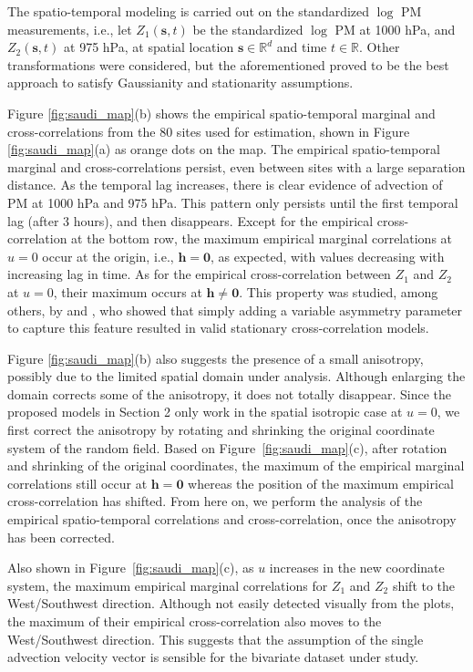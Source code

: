 \documentclass[12pt]{article}
\newcommand{\0}{\mathbf{0}}
\begin{document}
The spatio-temporal modeling is carried out on the standardized $\log $ PM measurements, i.e., let $Z_1(\mathbf{s},t)$ be the standardized $\log $ PM at 1000 hPa, and $Z_2(\mathbf{s},t)$ at 975 hPa, at spatial location $\mathbf{s} \in \mathbb{R}^d$ and time $t\in\mathbb{R}$. Other transformations were considered, but the aforementioned proved to be the best approach to satisfy Gaussianity and stationarity assumptions. 

Figure \ref{fig:saudi_map}(b) shows the empirical spatio-temporal marginal and cross-correlations from the 80 sites used for estimation, shown in Figure \ref{fig:saudi_map}(a) as orange dots on the map. The empirical spatio-temporal marginal and cross-correlations persist, even between sites with a large separation distance. As the temporal lag increases, there is clear evidence of advection of PM at 1000 hPa and 975 hPa. This pattern only persists until the first temporal lag (after 3 hours), and then disappears. Except for the empirical cross-correlation at the bottom row, the maximum empirical marginal correlations at $u=0$ occur at the origin, i.e., $\mathbf{h}=\mathbf{0}$, as expected, with values decreasing with increasing lag in time. As for the empirical cross-correlation between $Z_1$ and $Z_2$ at $u=0$, their maximum occurs at $\mathbf{h}\neq\mathbf{0}$. This property was studied, among others, by \citet{apanasovich2010cross} and \citet{li2011approach}, who showed that simply adding a variable asymmetry parameter to capture this feature resulted in valid stationary cross-correlation models.

Figure \ref{fig:saudi_map}(b) also suggests the presence of a small anisotropy, possibly due to the limited spatial domain under analysis. Although enlarging the domain corrects some of the anisotropy, it does not totally disappear. Since the proposed models in Section 2 only work in the spatial isotropic case at $u=0$, we first correct the anisotropy by rotating and shrinking the original coordinate system of the random field. Based on Figure~\ref{fig:saudi_map}(c), after rotation and shrinking of the original coordinates, the maximum of the empirical marginal correlations still occur at $\mathbf{h}=\mathbf{0}$ whereas the position of the maximum empirical cross-correlation has shifted. From here on, we perform the analysis of the empirical spatio-temporal correlations and cross-correlation, once the anisotropy has been corrected.

Also shown in Figure~\ref{fig:saudi_map}(c), as $u$ increases in the new coordinate system, the maximum empirical marginal correlations for $Z_1$ and $Z_2$ shift to the West/Southwest direction.  Although not easily detected visually from the plots, the maximum of their empirical cross-correlation also moves to the West/Southwest direction. This suggests that the assumption of the single advection velocity vector is sensible for the bivariate dataset under study. 
\end{document}
